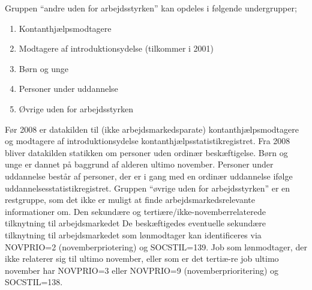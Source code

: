 Gruppen “andre uden for arbejdsstyrken” kan opdeles i følgende undergrupper;
\begin{enumerate} [topsep=6pt,itemsep=-1ex]
  \item Kontanthjælpsmodtagere
  \item Modtagere af introduktionsydelse (tilkommer i 2001)
  \item Børn og unge
  \item Personer under uddannelse
  \item Øvrige uden for arbejdsstyrken
\end{enumerate}

Før 2008 er datakilden til (ikke arbejdsmarkedsparate) kontanthjælpsmodtagere og modtagere af introduktionsydelse kontanthjælpsstatistikregistret. Fra 2008 bliver datakilden statikken om personer uden ordinær beskæftigelse. Børn og unge er dannet på baggrund af alderen ultimo november. Personer under uddannelse består af personer, der er i gang med en ordinær uddannelse ifølge uddannelsesstatistikregistret. Gruppen “øvrige uden for arbejdsstyrken” er en restgruppe, som det ikke er muligt at finde arbejdsmarkedsrelevante informationer om. Den sekundære og tertiære/ikke-novemberrelaterede tilknytning til arbejdsmarkedet De beskæftigedes eventuelle sekundære tilknytning til arbejdsmarkedet som lønmodtager kan identificeres via NOVPRIO=2 (novemberpriotering) og SOCSTIL=139. Job som lønmodtager, der ikke relaterer sig til ultimo november, eller som er det tertiæ-re job ultimo november har NOVPRIO=3 eller NOVPRIO=9 (novemberprioritering) og SOCSTIL=138.




